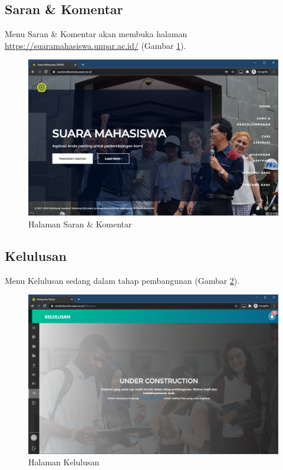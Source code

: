 \subsection{Saran \& Komentar}
    Menu Saran \& Komentar akan membuka halaman \url{https://suaramahasiswa.unpar.ac.id/} (Gambar \ref{fig:3_saran_komentar}).
    \begin{figure}[H]
    	\centering
    	\includegraphics[scale=0.45]{Gambar/sarankomentar.png}
    	\caption{Halaman Saran \& Komentar} 
    	\label{fig:3_saran_komentar}
    \end{figure}
        
\subsection{Kelulusan}
    Menu Kelulusan sedang dalam tahap pembangunan (Gambar \ref{fig:3_kelulusan}).
    \begin{figure}[H]
    	\centering
    	\includegraphics[scale=0.45]{Gambar/kelulusan.png}
    	\caption{Halaman Kelulusan} 
    	\label{fig:3_kelulusan}
    \end{figure}

